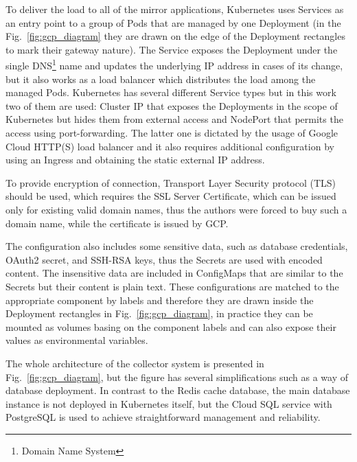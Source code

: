 To deliver the load to all of the mirror applications, Kubernetes uses Services as an entry point to a group of Pods that are managed by one Deployment (in the Fig.~\ref{fig:gcp_diagram} they are drawn on the edge of the Deployment rectangles to mark their gateway nature).
The Service exposes the Deployment under the single DNS\footnote{Domain Name System} name and updates the underlying IP address in cases of its change, but it also works as a load balancer which distributes the load among the managed Pods.
Kubernetes has several different Service types but in this work two of them are used: Cluster IP that exposes the Deployments in the scope of Kubernetes but hides them from external access and NodePort that permits the access using port-forwarding.
The latter one is dictated by the usage of Google Cloud HTTP(S) load balancer and it also requires additional configuration by using an Ingress and obtaining the static external IP address.

To provide encryption of connection, Transport Layer Security protocol (TLS) should be used, which requires the SSL Server Certificate, which can be issued only for existing valid domain names, thus the authors were forced to buy such a domain name, while the certificate is issued by GCP\@.

The configuration also includes some sensitive data, such as database credentials, OAuth2 secret, and SSH-RSA keys, thus the Secrets are used with encoded content.
The insensitive data are included in ConfigMaps that are similar to the Secrets but their content is plain text.
These configurations are matched to the appropriate component by labels and therefore they are drawn inside the Deployment rectangles in Fig.~\ref{fig:gcp_diagram}, in practice they can be mounted as volumes basing on the component labels and can also expose their values as environmental variables.

The whole architecture of the collector system is presented in Fig.~\ref{fig:gcp_diagram}, but the figure has several simplifications such as a way of database deployment.
In contrast to the Redis cache database, the main database instance is not deployed in Kubernetes itself, but the Cloud SQL service with \mbox{PostgreSQL} is used to achieve straightforward management and reliability.
